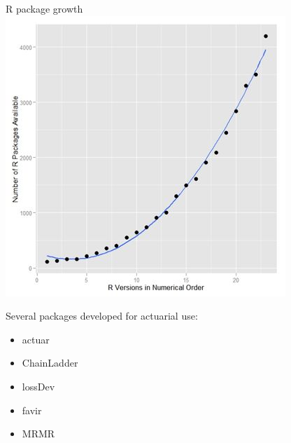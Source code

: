 \documentclass[xcolor=dvipsnames]{beamer}
\begin{document}
\begin{frame}{R package growth}
  \includegraphics[height=0.75\textheight]{../Part1/figure/rPackages}
\end{frame}

\begin{frame}
Several packages developed for actuarial use:
  \begin{itemize}
    \item actuar
    \item ChainLadder
    \item lossDev
    \item favir
    \item MRMR
  \end{itemize}
\end{frame}
\end{document}
